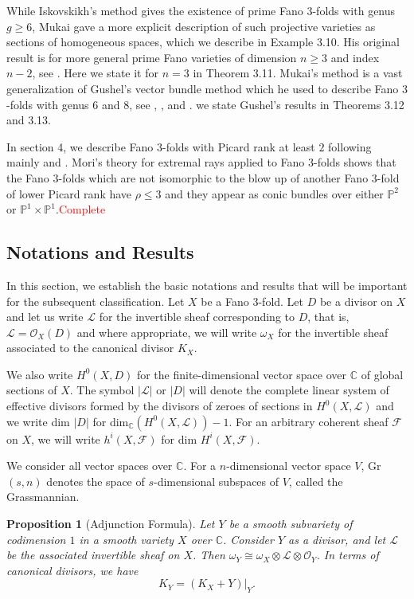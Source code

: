 \documentclass[11pt]{amsart}
\theoremstyle{plain}
\newtheorem{proposition}[theorem]{Proposition}
\theoremstyle{definition}
\theoremstyle{expl}
\begin{document}
While Iskovskikh's method gives the existence of prime Fano $3$-folds with genus $g \geq 6$, Mukai gave a more explicit description of such projective varieties as sections of homogeneous spaces, which we describe in Example 3.10. His original result is for more general prime Fano varieties of dimension $n\geq 3$ and index $n-2$, see \cite{Muk89}. Here we state it for $n=3$ in Theorem 3.11. Mukai's method is a vast generalization of Gushel's vector bundle method which he used to describe Fano $3$-folds with genus $6$ and $8$, see \cite{Gus6}, \cite{Gus83}, and \cite{Gus92}. we state Gushel's results in Theorems 3.12 and 3.13.

In section 4, we describe Fano $3$-folds with Picard rank at least $2$ following mainly \cite{MM81} and \cite{MM83}. Mori's theory for extremal rays applied to Fano $3$-folds shows that the Fano $3$-folds which are not isomorphic to the blow up of another Fano $3$-fold of lower Picard rank have $\rho \leq 3$ and they appear as conic bundles over either $\mathbb{P}^2$ or $\mathbb{P}^1 \times \mathbb{P}^1$.\textcolor{red}{Complete}

\subsection{Notations and Results}
In this section, we establish the basic notations and results that will be important for the subsequent classification. 
Let $X$ be a Fano $3$-fold. 
Let $D$ be a divisor on $X$ and let us write $\mathcal{L}$ for the invertible sheaf corresponding to $D$, that is, $\mathcal{L} = \mathcal{O}_X(D)$ and where appropriate, we will write $\omega_X$ for the invertible sheaf associated to the canonical divisor $K_X$.

We also write $H^0(X,D)$ for the finite-dimensional vector space over $\mathbb{C}$ of global sections of $X$.
The symbol $|\mathcal{L}|$ or $|D|$ will denote the complete linear system of effective divisors formed by the divisors of zeroes of sections in $H^0(X,\mathcal{L})$ and we write dim $|D|$ for dim$_{\mathbb{C}}(H^0(X,\mathcal{L})) -1$.
For an arbitrary coherent sheaf $\mathcal{F}$ on $X$, we will write $h^i(X,\mathcal{F})$ for dim $H^i(X,\mathcal{F})$. 

We consider all vector spaces over $\mathbb{C}$. For a $n$-dimensional vector space $V$, Gr$(s,n)$ denotes the space of $s$-dimensional subspaces of $V$, called the Grassmannian.
\begin{proposition}[Adjunction Formula]
    Let $Y$ be a smooth subvariety of codimension $1$ in a smooth variety $X$ over $\mathbb{C}$. Consider $Y$ as a divisor, and let $\mathcal{L}$ be the associated invertible sheaf on $X$. Then $\omega_Y \cong \omega_X \otimes \mathcal{L}\otimes \mathcal{O}_Y$. In terms of canonical divisors, we have 
    \[
    K_Y = (K_X+Y)|_Y.
    \]
\end{proposition}
\end{document}
